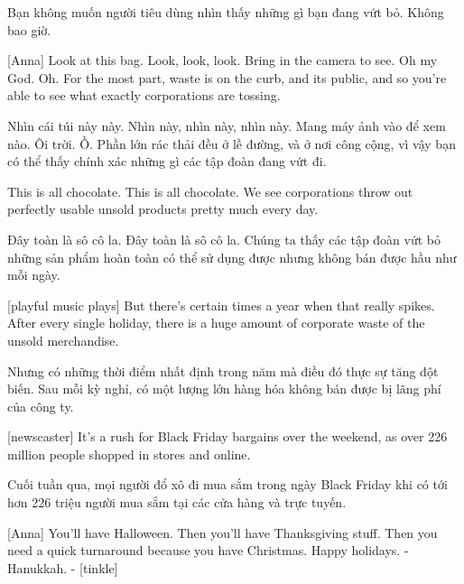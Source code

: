 \documentclass[a4paper]{article}
\begin{document}
	
	\begin{vietnamese-v2}
		 Bạn không muốn người tiêu dùng nhìn thấy những gì bạn đang vứt bỏ. Không bao giờ.
	\end{vietnamese-v2}
	
	[Anna] Look at this bag.
	Look, look, look.
	Bring in the camera to see.
	Oh my God. Oh.
	For the most part, waste is on the curb, and its public, and so you're able to see what exactly corporations are tossing.
	
	\begin{vietnamese-v2}
		[Anna] Nhìn cái túi này này.
		Nhìn này, nhìn này, nhìn này.
		Mang máy ảnh vào để xem nào.
		Ôi trời. Ồ.
		Phần lớn rác thải đều ở lề đường, và ở nơi công cộng, vì vậy bạn có thể thấy chính xác những gì các tập đoàn đang vứt đi.
	\end{vietnamese-v2}
	
	This is all chocolate.
	This is all chocolate.
	We see corporations throw out perfectly usable unsold products pretty much every day.
	
	\begin{vietnamese-v2}
		Đây toàn là sô cô la.
		Đây toàn là sô cô la.
		Chúng ta thấy các tập đoàn vứt bỏ những sản phẩm hoàn toàn có thể sử dụng được nhưng không bán được hầu như mỗi ngày.
	\end{vietnamese-v2}
	
	[playful music plays]
	But there's certain times a year when that really spikes.
	After every single holiday, there is a huge amount of corporate waste of the unsold merchandise.
	
	\begin{vietnamese-v2}
		Nhưng có những thời điểm nhất định trong năm mà điều đó thực sự tăng đột biến.
		Sau mỗi kỳ nghỉ, có một lượng lớn hàng hóa không bán được bị lãng phí của công ty.
	\end{vietnamese-v2}
	
	[newscaster] It's a rush for Black Friday bargains over the weekend, as over 226 million people shopped in stores and online.
	
	\begin{vietnamese-v2}
		 Cuối tuần qua, mọi người đổ xô đi mua sắm trong ngày Black Friday khi có tới hơn 226 triệu người mua sắm tại các cửa hàng và trực tuyến.
	\end{vietnamese-v2}
	
	[Anna] You'll have Halloween.
	Then you'll have Thanksgiving stuff.
	Then you need a quick turnaround because you have Christmas.
	Happy holidays.
	- Hanukkah. - [tinkle]
	
\end{document}
